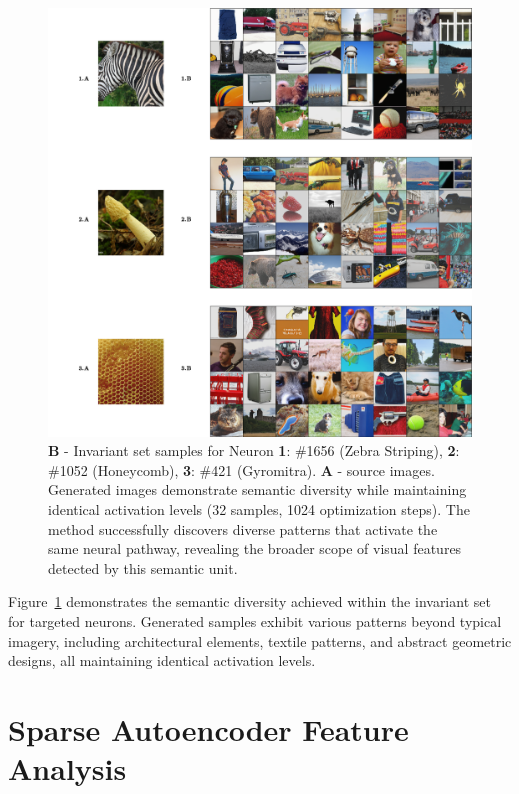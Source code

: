 \begin{figure}[h]
\centering
\includegraphics[width=\linewidth]{figures/main/sae_results_1.png}
\caption{ \textbf{B} - Invariant set samples for Neuron \textbf{1}: \#1656 (Zebra Striping), \textbf{2}: \#1052 (Honeycomb), \textbf{3}: \#421 (Gyromitra). \textbf{A} - source images. Generated images demonstrate semantic diversity while maintaining identical activation levels (32 samples, 1024 optimization steps). The method successfully discovers diverse patterns that activate the same neural pathway, revealing the broader scope of visual features detected by this semantic unit.}
\label{fig:experiment_1_1_qualitative}
\end{figure}

Figure~\ref{fig:experiment_1_1_qualitative} demonstrates the semantic diversity achieved within the invariant set for targeted neurons. Generated samples exhibit various patterns beyond typical imagery, including architectural elements, textile patterns, and abstract geometric designs, all maintaining identical activation levels.

\section{Sparse Autoencoder Feature Analysis}

